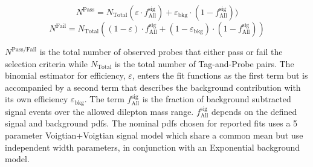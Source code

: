\begin{equation}
	N^{\text{Pass}} = N_{\text{Total}} (\varepsilon \cdot f^{\text{sig}}_{\text{All}} ) +  \varepsilon_{\text{bkg}} \cdot (1-f^{\text{sig} }_{\text{All}}) )
\end{equation} 
\begin{equation}
	N^{\text{Fail}} = N_{\text{Total}} ( (1-\varepsilon) \cdot f^{\text{sig}}_{\text{All}} +   (1-\varepsilon_{\text{bkg}}) \cdot (1-f^{\text{sig}}_{\text{All}}) )
\end{equation}

$N^{\text{Pass/Fail}}$ is the total number of observed probes that either pass or fail the selection criteria while $N_{\text{Total}}$ is the total number of Tag-and-Probe pairs.
The binomial estimator for efficiency, $\varepsilon$, enters the fit functions as the first term but is accompanied by a second term that describes the background contribution with its own efficiency $\varepsilon_{\text{bkg}}$.  The term $f^{\text{sig}}_{\text{All}}$ is the fraction of background subtracted signal events over the allowed dilepton mass range.  $f^{\text{sig}}_{\text{All}}$ depends on the defined signal and background pdfs. The nominal pdfs chosen for reported fits uses a 5 parameter Voigtian+Voigtian signal model which share a common mean but use independent width parameters, in conjunction with an Exponential background model. 








\FloatBarrier

